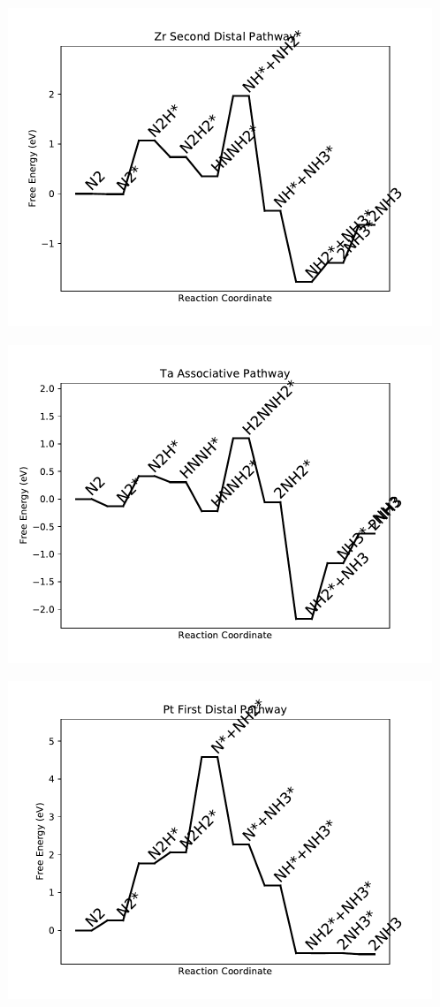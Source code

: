 \begin{figure}
\includegraphics[width=0.8\linewidth]{data/plots/Zr_distal_2.pdf}
\label{fig:Zr_distal_2}
\end{figure}

\begin{figure}
\includegraphics[width=0.8\linewidth]{data/plots/Ta_associative.pdf}
\label{fig:Ta_associative}
\end{figure}

\begin{figure}
\includegraphics[width=0.8\linewidth]{data/plots/Pt_distal_1.pdf}
\label{fig:Pt_distal_1}
\end{figure}

